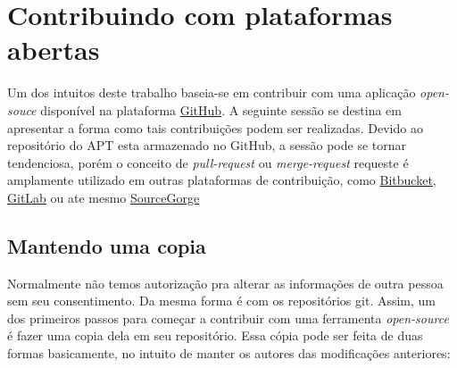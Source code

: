 \section{Contribuindo com plataformas abertas} %
\label{sec:contribuindo_com_plataformas_abertas}

Um dos intuitos deste trabalho baseia-se em contribuir com uma aplicação \textit{open-souce} disponível na plataforma \href{GitHub.com}{GitHub}. A seguinte sessão se destina em apresentar a forma como tais contribuições podem ser realizadas. Devido ao repositório do APT esta armazenado no GitHub, a sessão pode se tornar tendenciosa, porém o conceito de \textit{pull-request} ou  \textit{merge-request} requeste é amplamente utilizado em outras plataformas de contribuição, como \href{https://bitbucket.org/}{Bitbucket}, \href{https://gitlab.com/}{GitLab} ou ate mesmo \href{http://sourceforge.net/}{SourceGorge}


\subsection*{Mantendo uma copia} %
\label{sub:mantendo_uma_copia_sua}


Normalmente não temos autorização pra alterar as informações de outra pessoa sem seu consentimento. Da mesma forma  é com os repositórios {\code git}. Assim, um dos primeiros passos para começar a contribuir com uma ferramenta \textit{open-source} é fazer uma copia dela em seu repositório. Essa cópia pode ser feita de duas formas basicamente, no intuito de manter os autores das modificações anteriores:

